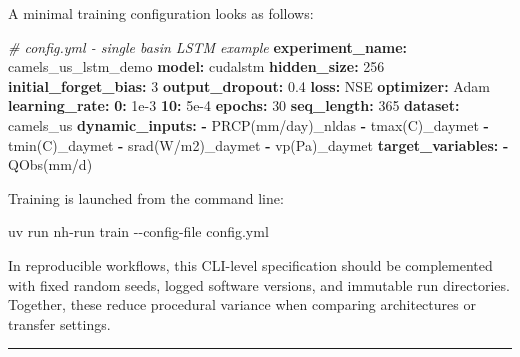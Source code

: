 \documentclass[
]{krantz}
\newenvironment{Shaded}{\begin{snugshade}}{\end{snugshade}}
\newcommand{\AttributeTok}[1]{\textcolor[rgb]{0.13,0.29,0.53}{#1}}
\newcommand{\CommentTok}[1]{\textcolor[rgb]{0.56,0.35,0.01}{\textit{#1}}}
\newcommand{\DecValTok}[1]{\textcolor[rgb]{0.00,0.00,0.81}{#1}}
\newcommand{\ExtensionTok}[1]{#1}
\newcommand{\FloatTok}[1]{\textcolor[rgb]{0.00,0.00,0.81}{#1}}
\newcommand{\FunctionTok}[1]{\textcolor[rgb]{0.13,0.29,0.53}{\textbf{#1}}}
\newcommand{\KeywordTok}[1]{\textcolor[rgb]{0.13,0.29,0.53}{\textbf{#1}}}
\newcommand{\NormalTok}[1]{#1}
\begin{document}
A minimal training configuration looks as follows:

\begin{Shaded}
\begin{Highlighting}[]
\CommentTok{\# config.yml  {-}  single basin LSTM example}
\FunctionTok{experiment\_name}\KeywordTok{:}\AttributeTok{ camels\_us\_lstm\_demo}
\FunctionTok{model}\KeywordTok{:}\AttributeTok{ cudalstm}
\FunctionTok{hidden\_size}\KeywordTok{:}\AttributeTok{ }\DecValTok{256}
\FunctionTok{initial\_forget\_bias}\KeywordTok{:}\AttributeTok{ }\DecValTok{3}
\FunctionTok{output\_dropout}\KeywordTok{:}\AttributeTok{ }\FloatTok{0.4}
\FunctionTok{loss}\KeywordTok{:}\AttributeTok{ NSE}
\FunctionTok{optimizer}\KeywordTok{:}\AttributeTok{ Adam}
\FunctionTok{learning\_rate}\KeywordTok{:}
\AttributeTok{  }\FunctionTok{0}\KeywordTok{:}\AttributeTok{ }\FloatTok{1e{-}3}
\AttributeTok{  }\FunctionTok{10}\KeywordTok{:}\AttributeTok{ }\FloatTok{5e{-}4}
\FunctionTok{epochs}\KeywordTok{:}\AttributeTok{ }\DecValTok{30}
\FunctionTok{seq\_length}\KeywordTok{:}\AttributeTok{ }\DecValTok{365}
\FunctionTok{dataset}\KeywordTok{:}\AttributeTok{ camels\_us}
\FunctionTok{dynamic\_inputs}\KeywordTok{:}
\AttributeTok{  }\KeywordTok{{-}}\AttributeTok{ PRCP(mm/day)\_nldas}
\AttributeTok{  }\KeywordTok{{-}}\AttributeTok{ tmax(C)\_daymet}
\AttributeTok{  }\KeywordTok{{-}}\AttributeTok{ tmin(C)\_daymet}
\AttributeTok{  }\KeywordTok{{-}}\AttributeTok{ srad(W/m2)\_daymet}
\AttributeTok{  }\KeywordTok{{-}}\AttributeTok{ vp(Pa)\_daymet}
\FunctionTok{target\_variables}\KeywordTok{:}
\AttributeTok{  }\KeywordTok{{-}}\AttributeTok{ QObs(mm/d)}
\end{Highlighting}
\end{Shaded}

Training is launched from the command line:

\begin{Shaded}
\begin{Highlighting}[]
\ExtensionTok{uv}\NormalTok{ run nh{-}run train }\AttributeTok{{-}{-}config{-}file}\NormalTok{ config.yml}
\end{Highlighting}
\end{Shaded}

In reproducible workflows, this CLI-level specification should be complemented with
fixed random seeds, logged software versions, and immutable run directories. Together,
these reduce procedural variance when comparing architectures or transfer settings.

\begin{center}\rule{0.5\linewidth}{0.5pt}\end{center}
\end{document}
